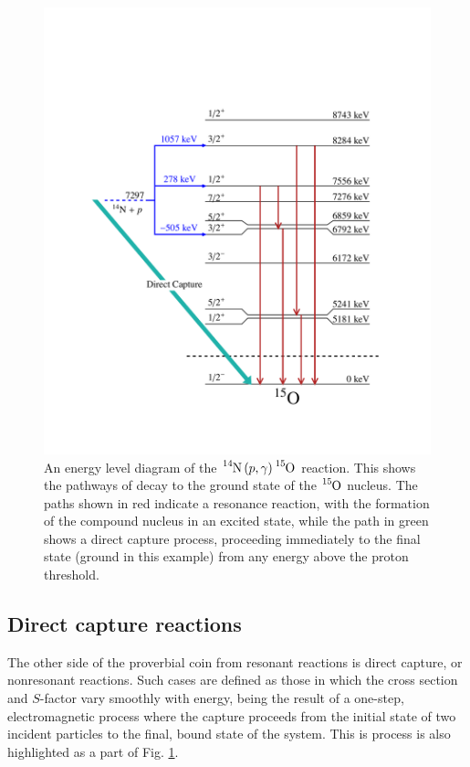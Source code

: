 \begin{figure}
\includegraphics[width=\linewidth]{figures/levelsO15.pdf}
\caption{An energy level diagram of the $\ce{^{14}N} \left( p, \gamma \right) \ce{^{15}O}$ reaction. This shows the pathways of decay to the ground state of the $\ce{^{15}O}$ nucleus. The paths shown in red indicate a resonance reaction, with the formation of the compound nucleus in an excited state, while the path in green shows a direct capture process, proceeding immediately to the final state (ground in this example) from any energy above the proton threshold.}
\label{fig: level diagram}
\end{figure}




\subsection{Direct capture reactions}

The other side of the proverbial coin from resonant reactions is direct capture, or nonresonant reactions. Such cases are defined as those in which the cross section and $S$-factor vary smoothly with energy, being the result of a one-step, electromagnetic process where the capture proceeds from the initial state of two incident particles to the final, bound state of the system. This is process is also highlighted as a part of Fig. \ref{fig: level diagram}. 

